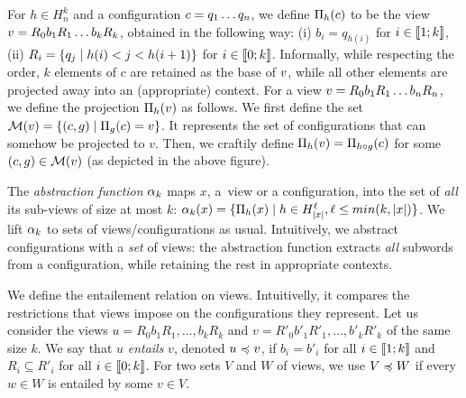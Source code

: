 For $h\in H_n^k$ and a configuration $c =q_1\ldots q_n$, 
we define $\Pi_{h}(c)$ to
be %
the view $v = R_0b_1R_1\ldots b_kR_k$, obtained in the
following way: %
%
(i) $b_i=q_{h(i)}$ for $i\in\llbracket{1};{k}\rrbracket$, %
(ii) $R_i=\{{q_j}\mathrel{}\mid\mathrel{}{h(i)<j<h(i+1)}\}$ for $i\in\llbracket{0};{k}\rrbracket$. %
Informally, while respecting the order, $k$ elements of $c$
are retained as the base of $v$, while all other
elements are projected away into an (appropriate) context.
%
For a view $v = R_0b_1R_1\ldots b_nR_n$, we define the projection
$\Pi_{h}(v)$ as follows. %
We first define the set ${\mathcal{M}}(v)=\{{(c,g)}\mathrel{}\mid\mathrel{}{\Pi_{g}(c)=v}\}$. It
represents the set of configurations that can somehow be projected to
$v$. %
Then, we craftily define $\Pi_{h}(v) =\Pi_{h\circ g}(c)$ for some
$(c,g)\in{\mathcal{M}}(v)$ (as depicted in the above figure).

%
The {\it abstraction function} $\alpha_k$ maps $x$, a~view or a configuration, 
into the set of \emph{all} its sub-views of size at most $k$:
%
$\project k x = %
\setcomp{\proj h {x}}{h\in H_{\sizeof x}^\ell,\ell\leq min(k,\sizeof x)}$.
%
We lift $\alpha_k$ to sets of views/configurations as usual.
%
Intuitively, we abstract configurations with a \emph{set} of views:
the abstraction function extracts \emph{all} subwords from a
configuration, while retaining the rest in appropriate contexts. %
%

We define the entailement relation on views. Intuitivelly, it compares
the restrictions that views impose on the configurations they
represent. %
Let us consider the views $u = R_0b_1R_1,\ldots,b_kR_k$ and $v =
R'_0b'_1R'_1,\ldots,b'_kR'_k$ of the same size $k$. We say that $u$
\emph{entails} $v$, denoted $u\preccurlyeq v$, if $b_i=b'_i$ for all
$i\in\llbracket{1};{k}\rrbracket$ and $R_i\subseteq R'_i$ for all $i\in\llbracket{0};{k}\rrbracket$. %
%
For two sets $V$ and $W$ of views, we use $V\preccurlyeq W$ if every $w\in
W$ is entailed by some $v\in V$.


